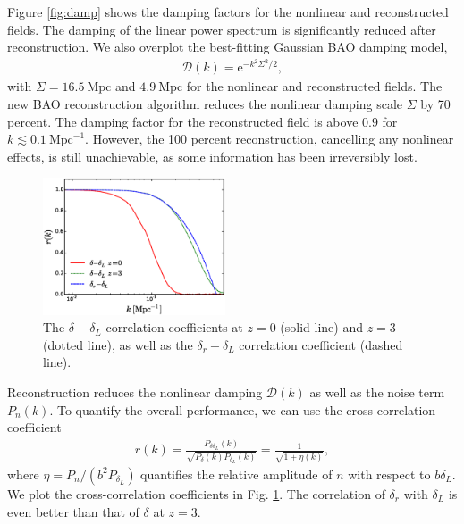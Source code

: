 \documentclass[aps,prd,twocolumn,showpacs,superscriptaddress,groupedaddress,nofootinbib]{revtex4}  %
\newcommand{\mr}{\mathrm}
\newcommand{\bea}{\begin{eqnarray}}
\newcommand{\eea}{\end{eqnarray}}
\begin{document}
Figure \ref{fig:damp} shows the damping factors for the 
nonlinear and reconstructed fields. The damping of the linear power spectrum is 
significantly reduced after reconstruction. We also overplot the best-fitting 
Gaussian BAO damping model,
\bea
\mathcal{D}(k)=\mr{e}^{-k^2\Sigma^2/2},
\eea
with $\Sigma=16.5\ \mr{Mpc}$ and $4.9\ \mr{Mpc}$ for the nonlinear and 
reconstructed fields. 
The new BAO reconstruction algorithm reduces the nonlinear damping
scale $\Sigma$ by 70 percent. 
The damping factor for the reconstructed field is above $0.9$ for 
$k\lesssim0.1\ \mr{Mpc}^{-1}$. 
However, the 100 percent reconstruction, cancelling any nonlinear effects,
is still unachievable, as some information has been irreversibly lost. 

\begin{figure}[tbp]
\begin{center}
\includegraphics[width=0.48\textwidth]{f4.eps}
\end{center}
\vspace{-0.7cm}
\caption{The $\delta-\delta_L$ correlation coefficients at $z=0$ (solid
line) and $z=3$ (dotted line), as well as the $\delta_r-\delta_L$ 
correlation coefficient (dashed line).}
\label{fig:xcc}
\end{figure}

Reconstruction reduces the nonlinear damping $\mathcal{D}(k)$ as well as the 
noise term $P_{n}(k)$. To quantify the overall performance, we can use the 
cross-correlation coefficient 
\bea
r(k)=\frac{P_{\delta\delta_L}(k)}
{\sqrt{P_{\delta}(k)P_{\delta_L}(k)}}
=\frac{1}{\sqrt{1+\eta(k)}},
\eea
where $\eta=P_n/(b^2P_{\delta_L})$ quantifies the relative amplitude
of $n$ with respect to $b\delta_L$. We plot the cross-correlation coefficients
in Fig. \ref{fig:xcc}. The correlation of $\delta_r$ with
$\delta_L$ is even better than that of $\delta$ at $z=3$.
\end{document}
